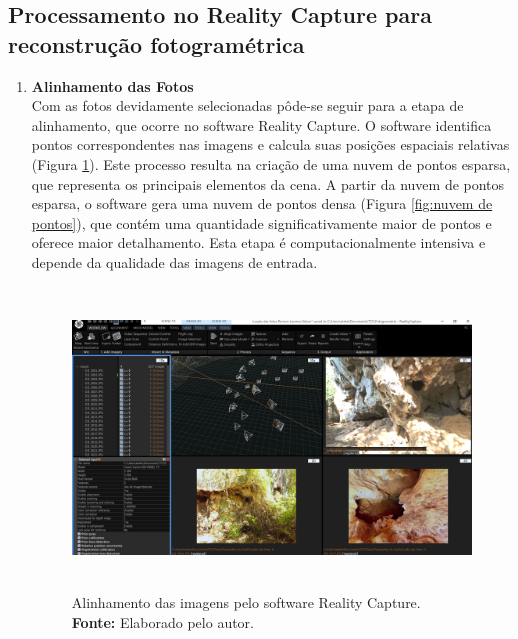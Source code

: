     \subsection{Processamento no Reality Capture para reconstrução fotogramétrica}
    \begin{enumerate}
\item \textbf{Alinhamento das Fotos} \\
Com as fotos devidamente selecionadas pôde-se seguir para a etapa de alinhamento, que ocorre no software Reality Capture. O software identifica pontos correspondentes nas imagens e calcula suas posições espaciais relativas (Figura \ref{fig:alinhamento}). Este processo resulta na criação de uma nuvem de pontos esparsa, que representa os principais elementos da cena. 
A partir da nuvem de pontos esparsa, o software gera uma nuvem de pontos densa (Figura \ref{fig:nuvem de pontos}), que contém uma quantidade significativamente maior de pontos e oferece maior detalhamento. Esta etapa é computacionalmente intensiva e depende da qualidade das imagens de entrada.

\begin{figure}[H]
    \centering
        \centering
        \includegraphics[height=8cm, keepaspectratio]{img/reality e fotogrametria processo/cameras alinhamento.png}
        \caption{Alinhamento das imagens pelo software Reality Capture. \\
            \textbf{Fonte:} Elaborado pelo autor.}
        \label{fig:alinhamento}
\end{figure}


\end{enumerate}
